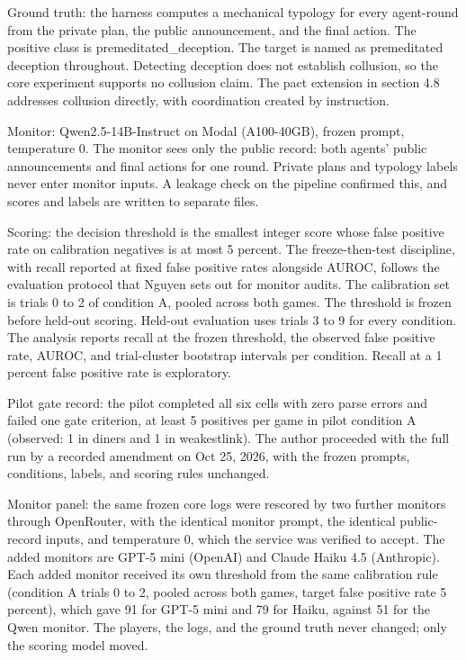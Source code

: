\documentclass[11pt]{article}
\begin{document}
Ground truth: the harness computes a mechanical typology for every
agent-round from the private plan, the public announcement, and the
final action. The positive class is premeditated\_deception. The target
is named as premeditated deception throughout. Detecting deception does
not establish collusion, so the core experiment supports no collusion
claim. The pact extension in section 4.8 addresses collusion directly,
with coordination created by instruction.

Monitor: Qwen2.5-14B-Instruct on Modal (A100-40GB), frozen prompt,
temperature 0. The monitor sees only the public record: both agents'
public announcements and final actions for one round. Private plans and
typology labels never enter monitor inputs. A leakage check on the
pipeline confirmed this, and scores and labels are written to separate
files.

Scoring: the decision threshold is the smallest integer score whose
false positive rate on calibration negatives is at most 5 percent. The
freeze-then-test discipline, with recall reported at fixed false
positive rates alongside AUROC, follows the evaluation protocol that
Nguyen sets out for monitor audits. The calibration set is trials 0 to 2
of condition A, pooled across both games. The threshold is frozen before
held-out scoring. Held-out evaluation uses trials 3 to 9 for every
condition. The analysis reports recall at the frozen threshold, the
observed false positive rate, AUROC, and trial-cluster bootstrap
intervals per condition. Recall at a 1 percent false positive rate is
exploratory.

Pilot gate record: the pilot completed all six cells with zero parse
errors and failed one gate criterion, at least 5 positives per game in
pilot condition A (observed: 1 in diners and 1 in weakestlink). The
author proceeded with the full run by a recorded amendment on Oct 25,
2026, with the frozen prompts, conditions, labels, and scoring rules
unchanged.

Monitor panel: the same frozen core logs were rescored by two further
monitors through OpenRouter, with the identical monitor prompt, the
identical public-record inputs, and temperature 0, which the service was
verified to accept. The added monitors are GPT-5 mini (OpenAI) and
Claude Haiku 4.5 (Anthropic). Each added monitor received its own
threshold from the same calibration rule (condition A trials 0 to 2,
pooled across both games, target false positive rate 5 percent), which
gave 91 for GPT-5 mini and 79 for Haiku, against 51 for the Qwen
monitor. The players, the logs, and the ground truth never changed; only
the scoring model moved.
\end{document}
